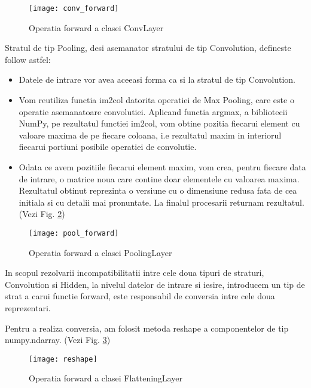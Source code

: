 	\vfill
	
	\begin{figure}[H]
		\texttt{[image: conv\_forward]}  
		\caption{\label{fig:conv_forward} Operatia forward a clasei ConvLayer}
	\end{figure}

	
	Stratul de tip Pooling, desi asemanator stratului de tip Convolution, defineste follow astfel:
	
	\begin{itemize}
	\item	Datele de intrare vor avea aceeasi forma ca si la stratul de tip Convolution. 
	
	\item	Vom reutiliza functia im2col datorita operatiei de Max Pooling, care este o operatie asemanatoare convolutiei. Aplicand functia argmax, a bibliotecii NumPy, pe rezultatul functiei im2col, vom obtine pozitia fiecarui element cu valoare maxima de pe fiecare coloana, i.e rezultatul maxim in interiorul fiecarui portiuni posibile operatiei de convolutie. 
	
	\item	Odata ce avem pozitiile fiecarui element maxim, vom crea, pentru fiecare data de intrare, o matrice noua care contine doar elementele cu valoarea maxima. Rezultatul obtinut reprezinta o versiune cu o dimensiune redusa fata de cea initiala si cu detalii mai pronuntate. La finalul procesarii returnam rezultatul.	(Vezi Fig. \ref{fig:pool_forward})
	\end{itemize}

	\vfill
	
	\begin{figure}[H]
		\texttt{[image: pool\_forward]}  
		\caption{\label{fig:pool_forward} Operatia forward a clasei PoolingLayer}
	\end{figure}
	
	
	In scopul rezolvarii incompatibilitatii intre cele doua tipuri de straturi, Convolution si Hidden, la nivelul datelor de intrare si iesire, introducem un tip de strat a carui functie forward, este responsabil de conversia intre cele doua reprezentari.
	 
	Pentru a realiza conversia, am folosit metoda reshape a componentelor de tip numpy.ndarray. (Vezi Fig. \ref{fig:reshape})
	
	\begin{figure}[H]
		\texttt{[image: reshape]}  
		\caption{\label{fig:reshape} Operatia forward a clasei FlatteningLayer}
	\end{figure}
	
